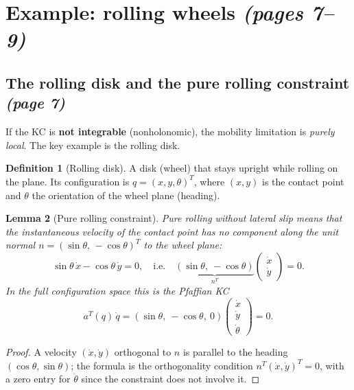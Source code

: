 \documentclass[11pt,a4paper]{article}
\theoremstyle{definition}
\newtheorem{definition}{Definition}[section]
\theoremstyle{plain}
\newtheorem{lemma}[definition]{Lemma}
\theoremstyle{remark}
\begin{document}
\section{Example: rolling wheels \emph{(pages 7--9)}}
 
\subsection{The rolling disk and the pure rolling constraint \emph{(page 7)}}
 
If the KC is \textbf{not integrable} (nonholonomic), the mobility limitation is \emph{purely local}. The key example is the rolling disk.
 
\begin{definition}[Rolling disk]
A disk (wheel) that stays upright while rolling on the plane. Its configuration is $q=(x,y,\theta)^{T}$, where $(x,y)$ is the contact point and $\theta$ the orientation of the wheel plane (heading).
\end{definition}
 
\begin{lemma}[Pure rolling constraint]
Pure rolling without lateral slip means that the instantaneous velocity of the contact point has no component along the unit normal $n=(\sin\theta,\,-\cos\theta)^{T}$ to the wheel plane:
\[
\sin\theta\,\dot x-\cos\theta\,\dot y=0,
\quad\text{i.e.}\quad
\underbrace{(\sin\theta,\ -\cos\theta)}_{n^{T}}\begin{pmatrix}\dot x\\ \dot y\end{pmatrix}=0 .
\]
In the full configuration space this is the Pfaffian KC
\[
a^{T}(q)\,\dot q=(\sin\theta,\ -\cos\theta,\ 0)\begin{pmatrix}\dot x\\ \dot y\\ \dot\theta\end{pmatrix}=0 .
\]
\end{lemma}
\begin{proof}
A velocity $(\dot x,\dot y)$ orthogonal to $n$ is parallel to the heading $(\cos\theta,\sin\theta)$; the formula is the orthogonality condition $n^{T}(\dot x,\dot y)^{T}=0$, with a zero entry for $\dot\theta$ since the constraint does not involve it.
\end{proof}
 
\end{document}
